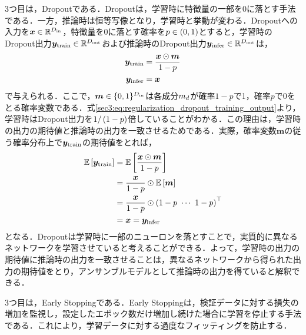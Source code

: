 3つ目は，Dropout\cite{srivastava2014dropout}である．Dropoutは，学習時に特徴量の一部を0に落とす手法である．一方，推論時は恒等写像となり，学習時と挙動が変わる．Dropoutへの入力を$\bm{x} \in \mathbb{R}^{D_{\text{in}}}$，特徴量を0に落とす確率を$p \in \left(0, 1\right)$とすると，学習時のDropout出力$\bm{y}_{\text{train}} \in \mathbb{R}^{D_{\text{out}}}$および推論時のDropout出力$\bm{y}_{\text{infer}} \in \mathbb{R}^{D_{\text{out}}}$は，
\begin{align}
    \bm{y}_{\text{train}} & = \frac{\bm{x} \odot \bm{m}}{1 - p} \label{sec3:eq:regularization_dropout_training_output} \\
    \bm{y}_{\text{infer}} & = \bm{x}
\end{align}
で与えられる．ここで，$\bm{m} \in \{0, 1\}^{D_{\text{in}}}$は各成分$m_{d}$が確率$1 - p$で1，確率$p$で0をとる確率変数である．式\eqref{sec3:eq:regularization_dropout_training_output}より，学習時はDropout出力を$1 / \left(1 - p\right)$倍していることがわかる．この理由は，学習時の出力の期待値と推論時の出力を一致させるためである．実際，確率変数$\bm{m}$の従う確率分布上で$\bm{y}_{\text{train}}$の期待値をとれば，
\begin{align}
    \mathbb{E}\left[\bm{y}_{\text{train}}\right] & = \mathbb{E}\left[\frac{\bm{x} \odot \bm{m}}{1 - p}\right]             \\
                                                   & = \frac{\bm{x}}{1 - p} \odot \mathbb{E}\left[\bm{m}\right]             \\
                                                   & = \frac{\bm{x}}{1 - p} \odot \left(1 - p ~ \cdots ~ 1 - p\right)^\top \\
                                                   & = \bm{x} = \bm{y}_{\text{infer}}
\end{align}
となる．Dropoutは学習時に一部のニューロンを落とすことで，実質的に異なるネットワークを学習させていると考えることができる．よって，学習時の出力の期待値に推論時の出力を一致させることは，異なるネットワークから得られた出力の期待値をとり，アンサンブルモデルとして推論時の出力を得ていると解釈できる．

3つ目は，Early Stoppingである．Early Stoppingは，検証データに対する損失の増加を監視し，設定したエポック数だけ増加し続けた場合に学習を停止する手法である．これにより，学習データに対する過度なフィッティングを防止する．

